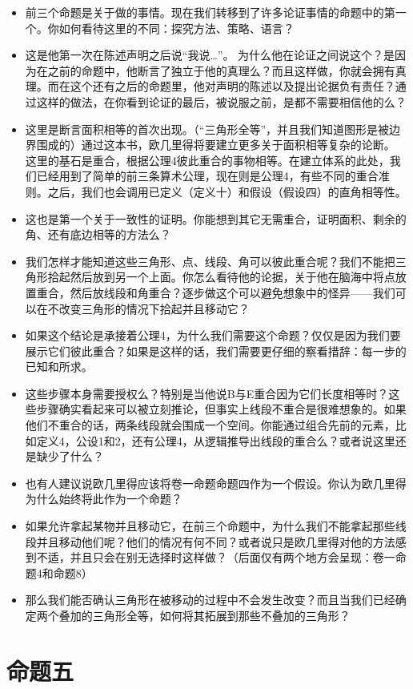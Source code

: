 \documentclass[
]{book}
\providecommand{\tightlist}{%
  \setlength{\itemsep}{0pt}\setlength{\parskip}{0pt}}
\begin{document}
\begin{itemize}
\tightlist
\item
  前三个命题是关于做的事情。现在我们转移到了许多论证事情的命题中的第一个。你如何看待这里的不同：探究方法、策略、语言？
\item
  这是他第一次在陈述声明之后说``我说\ldots''。 为什么他在论证之间说这个？是因为在之前的命题中，他断言了独立于他的真理么？而且这样做，你就会拥有真理。而在这个还有之后的命题里，他对声明的陈述以及提出论据负有责任？通过这样的做法，在你看到论证的最后，被说服之前，是都不需要相信他的么？
\item
  这里是断言面积相等的首次出现。（``三角形全等''，并且我们知道图形是被边界围成的）通过这本书，欧几里得将要建立更多关于面积相等复杂的论断。
  这里的基石是重合，根据公理4彼此重合的事物相等。在建立体系的此处，我们已经用到了简单的前三条算术公理，现在则是公理4，有些不同的重合准则。之后，我们也会调用已定义（定义十）和假设（假设四）的直角相等性。
\item
  这也是第一个关于一致性的证明。你能想到其它无需重合，证明面积、剩余的角、还有底边相等的方法么？
\item
  我们怎样才能知道这些三角形、点、线段、角可以彼此重合呢？我们不能把三角形拾起然后放到另一个上面。你怎么看待他的论据，关于他在脑海中将点放置重合，然后放线段和角重合？逐步做这个可以避免想象中的怪异------我们可以在不改变三角形的情况下拾起并且移动它？
\item
  如果这个结论是承接着公理4，为什么我们需要这个命题？仅仅是因为我们要展示它们彼此重合？如果是这样的话，我们需要更仔细的察看措辞：每一步的已知和所求。
\item
  这些步骤本身需要授权么？特别是当他说B与E重合因为它们长度相等时？这些步骤确实看起来可以被立刻推论，但事实上线段不重合是很难想象的。如果他们不重合的话，两条线段就会围成一个空间。你能通过组合先前的元素，比如定义4，公设1和2，还有公理4，从逻辑推导出线段的重合么？或者说这里还是缺少了什么？
\item
  也有人建议说欧几里得应该将卷一命题命题四作为一个假设。你认为欧几里得为什么始终将此作为一个命题？
\item
  如果允许拿起某物并且移动它，在前三个命题中，为什么我们不能拿起那些线段并且移动他们呢？他们的情况有何不同？或者说只是欧几里得对他的方法感到不适，并且只会在别无选择时这样做？（后面仅有两个地方会呈现：卷一命题4和命题8）
\item
  那么我们能否确认三角形在被移动的过程中不会发生改变？而且当我们已经确定两个叠加的三角形全等，如何将其拓展到那些不叠加的三角形？
\end{itemize}

\hypertarget{ux547dux9898ux4e94}{%
\section{命题五}\label{ux547dux9898ux4e94}}
\end{document}
